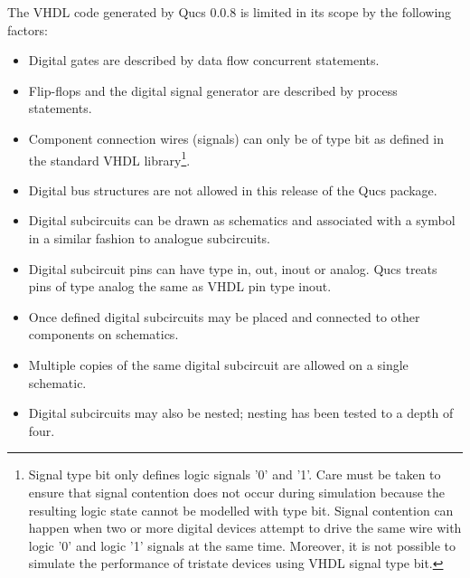 \addvspace{12pt}

The VHDL code generated by Qucs 0.0.8 is limited in its scope by the
following factors:
\begin{itemize}
\item
Digital gates are described by data flow concurrent statements.
\item
Flip-flops and the digital signal generator are described by process
statements.
\item
Component connection wires (signals) can only be of type bit as
defined in the standard VHDL library\footnote{Signal type bit only
defines logic signals '0' and '1'.  Care must be taken to ensure that
signal contention does not occur during simulation because the
resulting logic state cannot be modelled with type bit. Signal
contention can happen when two or more digital devices attempt to
drive the same wire with logic '0' and logic '1' signals at the same
time.  Moreover, it is not possible to simulate the performance of
tristate devices using VHDL signal type bit.}.
\item
Digital bus structures are not allowed in this release of the Qucs
package.
\item
Digital subcircuits can be drawn as schematics and associated with a
symbol in a similar fashion to analogue subcircuits.
\item
Digital subcircuit pins can have type in, out, inout or analog.  Qucs
treats pins of type analog the same as VHDL pin type inout.
\item
Once defined digital subcircuits may be placed and connected to other
components on schematics.
\item
Multiple copies of the same digital subcircuit are allowed on a single
schematic.
\item
Digital subcircuits may also be nested; nesting has been tested to a
depth of four.


\end{itemize}


